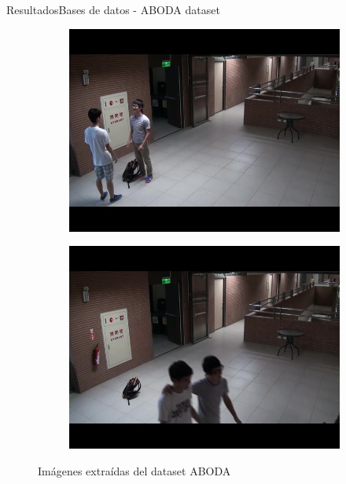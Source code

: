 \begin{frame}{Resultados}{Bases de datos - ABODA dataset}
\begin{figure}[ht]
  \centering
  \begin{subfigure}[b]{0.3\textwidth}
    \includegraphics[width=\textwidth]{Images/resultados/datasets/aboda_1.jpg}
    \caption{}
    \label{fig:aboda_1}
  \end{subfigure}
  \qquad
  \begin{subfigure}[b]{0.3\textwidth}
    \includegraphics[width=\textwidth]{Images/resultados/datasets/aboda_2.jpg}
    \caption{}
    \label{fig:aboda_2}
  \end{subfigure}
  \caption{Imágenes extraídas del dataset ABODA}
  \label{fig:aboda}
\end{figure}
    
\end{frame}

